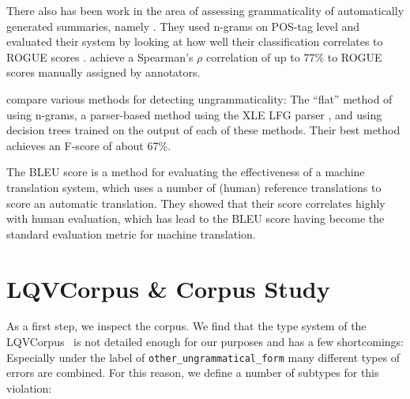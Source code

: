 \documentclass[a4paper,10pt]{scrartcl}
\theoremstyle{style}
\begin{document}
There also has been work in the area of assessing grammaticality of automatically generated summaries, namely \cite{vadlapudi2010automated}. They used n-grams on POS-tag level and evaluated their system by looking at how well their classification correlates to ROGUE scores \citep{lin2004rouge}. \citeauthor{vadlapudi2010automated} achieve a Spearman's $\rho{}$ correlation of up to 77\% to ROGUE scores manually assigned by annotators.

\cite{wagner2007comparative} compare various methods for detecting ungrammaticality: The ``flat'' method of using n-grams, a parser-based method using the XLE LFG parser \citep{maxwell1996efficient}, and using decision trees trained on the output of each of these methods. Their best method achieves an F-score of about 67\%.

The BLEU score \citep{papineni2002bleu} is a method for evaluating the effectiveness of a machine translation system, which uses a number of (human) reference translations to score an automatic translation. They showed that their score correlates highly with human evaluation, which has lead to the BLEU score having become the standard evaluation metric for machine translation.

\section{LQVCorpus \& Corpus Study}
\label{corpus_study}

As a first step, we inspect the corpus. We find that the type system of the LQVCorpus~\citep{valeeva} is not detailed enough for our purposes and has a few shortcomings: Especially under the label of \texttt{other\_ungrammatical\_form} many different types of errors are combined. For this reason, we define a number of subtypes for this violation:
\end{document}

